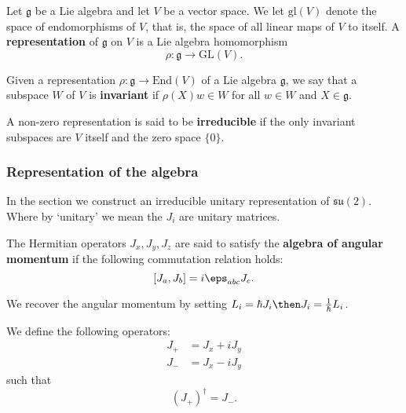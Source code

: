 \documentclass[12pt, a4paper]{article}
\begin{document}
\begin{definition}
    Let \(\mathfrak{g}\) be a Lie algebra and let \(V\) be a vector space. We let \(\text{gl}(V)\) denote the space of endomorphisms of \(V\), that is, the space of all linear maps of \(V\) to itself. A \textbf{representation} of \(\mathfrak{g}\) on \(V\) is a Lie algebra homomorphism
    \[\rho: \mathfrak{g} \rightarrow \text{GL}(V).\]
\end{definition}

\begin{definition}
    Given a representation \(\rho : \mathfrak{g} \rightarrow \text{End}(V)\) of a Lie algebra \(\mathfrak{g}\), we say that a subspace \(W\) of \(V\) is \textbf{invariant} if \(\rho(X)w \in W\) for all \(w \in W\) and \(X \in \mathfrak{g}\).
\end{definition}

\begin{definition}
    A non-zero representation is said to be \textbf{irreducible} if the only invariant subspaces are \(V\) itself and the zero space \(\{0\}\).
\end{definition}

\subsubsection{Representation of the algebra}

\begin{mdnote}
    In the section we construct an irreducible unitary representation of \(\mathfrak{su}(2)\). Where by `unitary' we mean the \(J_i\) are unitary matrices.
\end{mdnote}

\begin{definition}
    The Hermitian operators \(J_x,J_y,J_z\) are said to satisfy the \textbf{algebra of angular momentum} if the following commutation relation holds:
    \[[J_a,J_b]=i \eps_{abc} J_c.\]
\end{definition}

\begin{mdnote}
    We recover the angular momentum by setting \(L_i=\hbar J_i \then J_i = \frac{1}{\hbar}L_i\). 
\end{mdnote}

\begin{definition}
    We define the following operators:
    \[\begin{aligned}
        J_+ &= J_x +iJ_y \\
        J_-&= J_x -i J_y
    \end{aligned}\]
    such that 
    \[(J_+)^{\dagger}=J_-.\]
\end{definition}
\end{document}
